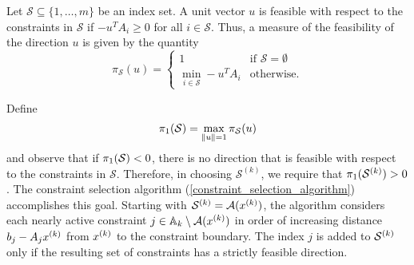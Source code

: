 \documentclass{article}
\begin{document}
Let $\mathcal{S} \subseteq \{1, \ldots,m\}$ be an  index set.    A unit vector $u$ is feasible with respect to the constraints in $\mathcal{S}$ if $-u^T A_i \ge 0$ for all $i \in \mathcal{S}$.   Thus,   a measure of the feasibility of the direction $u$ is given by the quantity 
\begin{equation}\label{define_feasibility_measure}
\pi_{\mathcal S}(u) = \left\{\begin{array}{ll} 1& \mbox{if } \mathcal S = \emptyset \\
\min_{i \in \mathcal S} -u^T A_i & \mbox{otherwise.}
\end{array} \right.
\end{equation}

Define 
\begin{align}
{\pi_1}(\mathcal S) = \max_{\|u\| = 1} \pi_{\mathcal S}(u)
 \label{define_alpha_two} 
\end{align}
and observe that if ${\pi_1}(\mathcal S) < 0$, there is no direction that is feasible with respect to the constraints in $\mathcal{S}$.    Therefore, in choosing $\mathcal{S}^{(k)}$, we require that ${\pi_1}(\mathcal{S}^{(k)}) > 0$.    The constraint selection algorithm (\cref{constraint_selection_algorithm}) accomplishes this goal.  Starting with $\mathcal{S}^{(k)}={\mathcal A}(x^{(k)})$, the algorithm considers each nearly active constraint $j \in {\mathbb A_{k}} \setminus {\mathcal A}(x^{(k)})$ in order of increasing distance  $b_j-A_j x^{(k)}$ from $x^{(k)}$ to the constraint boundary.   The index $j$ is added to $\mathcal{S}^{(k)}$ only if the resulting set of constraints has a strictly feasible direction.  
\end{document}
